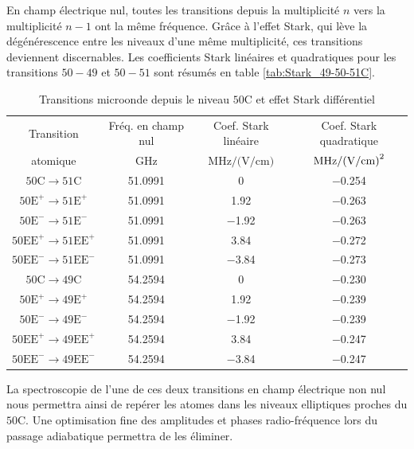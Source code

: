En champ électrique nul, toutes les transitions depuis la multiplicité $n$ vers la multiplicité $n-1$ ont la même fréquence.
Grâce à l'effet Stark, qui lève la dégénérescence entre les niveaux d'une même multiplicité, ces transitions deviennent discernables.
Les coefficients Stark linéaires et quadratiques pour les transitions $50-49$ et $50-51$ sont résumés en table \eqref{tab:Stark_49-50-51C}.		
%
\begin{table}[!h]
	\centering
	\caption[Transitions microonde depuis le niveau $\mathrm{50C}$ et effet Stark différentiel]{
	Transitions microonde depuis le niveau $\mathrm{50C}$ et effet Stark différentiel
	}
	\label{tab:Stark_49-50-51C}
	\begin{tabular}{cccc}
		\toprule\midrule
		Transition
		& Fréq. en champ nul
		& Coef. Stark linéaire
		& Coef. Stark quadratique
		\\
		atomique
		& $\si{\GHz}$
		& $\si{\MHz \per (\V \per\cm)}$
		& $\si{\MHz \per (\V \per\cm) \squared}$ \\
		\midrule
		$\mathrm{50C \rightarrow 51C}$
		& \SI{51.0991}{}
		& \SI{0}{}
		& \SI{-0.254}{} \\
		$\mathrm{50E^+ \rightarrow 51E^+}$
		& \SI{51.0991}{}
		& \SI[retain-explicit-plus]{+1.92}{}
		& \SI{-0.263}{} \\
		$\mathrm{50E^- \rightarrow 51E^-}$
		& \SI{51.0991}{}
		& \SI[retain-explicit-plus]{-1.92}{}
		& \SI{-0.263}{} \\
		$\mathrm{50EE^+ \rightarrow 51EE^+}$
		& \SI{51.0991}{}
		& \SI[retain-explicit-plus]{+3.84}{}
		& \SI{-0.272}{} \\
		$\mathrm{50EE^- \rightarrow 51EE^-}$
		& \SI{51.0991}{}
		& \SI[retain-explicit-plus]{-3.84}{}
		& \SI{-0.273}{} \\
		\midrule
		$\mathrm{50C \rightarrow 49C}$
		& \SI{54.2594}{}
		& \SI{0}{}
		& \SI{-0.230}{} \\
		$\mathrm{50E^+ \rightarrow 49E^+}$
		& \SI{54.2594}{}
		& \SI[retain-explicit-plus]{+1.92}{}
		& \SI{-0.239}{} \\
		$\mathrm{50E^- \rightarrow 49E^-}$
		& \SI{54.2594}{}
		& \SI[retain-explicit-plus]{-1.92}{}
		& \SI{-0.239}{} \\
		$\mathrm{50EE^+ \rightarrow 49EE^+}$
		& \SI{54.2594}{}
		& \SI[retain-explicit-plus]{+3.84}{}
		& \SI{-0.247}{} \\
		$\mathrm{50EE^- \rightarrow 49EE^-}$
		& \SI{54.2594}{}
		& \SI[retain-explicit-plus]{-3.84}{}
		& \SI{-0.247}{} \\
		\midrule
		\bottomrule
 	\end{tabular}
\end{table}
%
La spectroscopie de l'une de ces deux transitions en champ électrique non nul nous permettra ainsi de repérer les atomes dans les niveaux elliptiques proches du $\mathrm{50C}$.
Une optimisation fine des amplitudes et phases radio-fréquence lors du passage adiabatique permettra de les éliminer.


